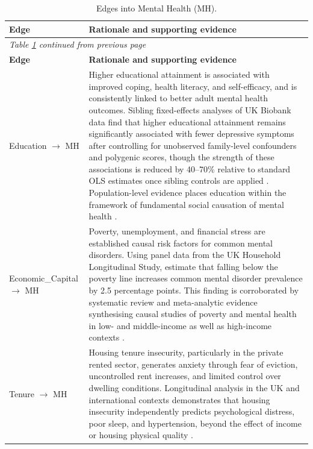 \begin{longtable}{@{}p{3.5cm}p{11.5cm}@{}}
\caption{Edges into Mental Health (MH).}
\label{tab:edges-mh}\\
\toprule
\textbf{Edge} & \textbf{Rationale and supporting evidence} \\
\midrule
\endfirsthead
\multicolumn{2}{l}{\textit{Table \ref{tab:edges-mh} continued from previous page}}\\
\toprule
\textbf{Edge} & \textbf{Rationale and supporting evidence} \\
\midrule
\endhead
\bottomrule
\endfoot
Education $\to$ MH & Higher educational attainment is associated with improved coping, health literacy, and self-efficacy, and is consistently linked to better adult mental health outcomes. Sibling fixed-effects analyses of UK Biobank data find that higher educational attainment remains significantly associated with fewer depressive symptoms after controlling for unobserved family-level confounders and polygenic scores, though the strength of these associations is reduced by 40–70\% relative to standard OLS estimates once sibling controls are applied \citep{amin_re-examining_2023}. Population-level evidence places education within the framework of fundamental social causation of mental health \citep{allen_social_2014, alqassim_impact_2024}. \\
\addlinespace
Economic\_Capital $\to$ MH & Poverty, unemployment, and financial stress are established causal risk factors for common mental disorders. Using panel data from the UK Household Longitudinal Study, \citet{thomson_effects_2023} estimate that falling below the poverty line increases common mental disorder prevalence by 2.5 percentage points. This finding is corroborated by systematic review and meta-analytic evidence synthesising causal studies of poverty and mental health in low- and middle-income as well as high-income contexts \citep{ridley_poverty_2020, salem_impact_2025}. \\
\addlinespace
Tenure $\to$ MH & Housing tenure insecurity, particularly in the private rented sector, generates anxiety through fear of eviction, uncontrolled rent increases, and limited control over dwelling conditions. Longitudinal analysis in the UK and international contexts demonstrates that housing insecurity independently predicts psychological distress, poor sleep, and hypertension, beyond the effect of income or housing physical quality \citep{thomson_impact_2024, rahman_unlocking_2024, zehrung_investigating_2024}. \\

\end{longtable}

